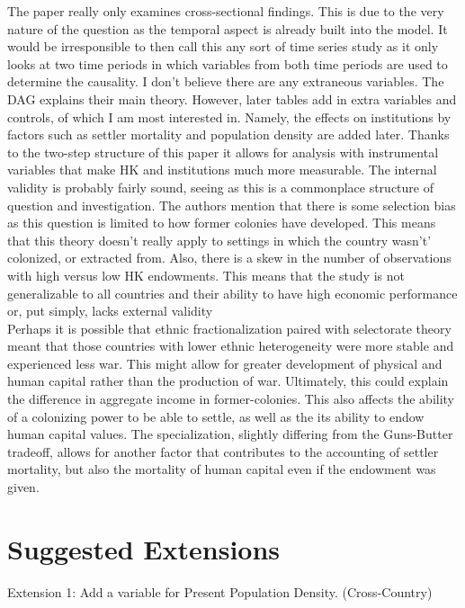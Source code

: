 \documentclass[12pt]{article}
\begin{document}
{The paper really only examines cross-sectional findings. This is due to the very nature of the question as the temporal aspect is already built into the model. It would be irresponsible to then call this any sort of time series study as it only looks at two time periods in which variables from both time periods are used to determine the causality. 
I don’t believe there are any extraneous variables. The DAG explains their main theory. However, later tables add in extra variables and controls, of which I am most interested in. Namely, the effects on institutions by factors such as settler mortality and population density are added later. Thanks to the two-step structure of this paper it allows for analysis with instrumental variables that make HK and institutions much more measurable.
The internal validity is probably fairly sound, seeing as this is a commonplace structure of question and investigation.
The authors mention that there is some selection bias as this question is limited to how former colonies have developed. This means that this theory doesn’t really apply to settings in which the country wasn’t’ colonized, or extracted from. Also, there is a skew in the number of observations with high versus low HK endowments. This means that the study is not generalizable to all countries and their ability to have high economic performance or, put simply, lacks external validity
 \\


Perhaps it is possible that ethnic fractionalization paired with selectorate theory meant that those countries with lower ethnic heterogeneity were more stable and experienced less war. This might allow for greater development of physical and human capital rather than the production of war. Ultimately, this could explain the difference in aggregate income in former-colonies. This also affects the ability of a colonizing power to be able to settle, as well as the its ability to endow human capital values. The specialization, slightly differing from the Guns-Butter tradeoff, allows for another factor that contributes to the accounting of settler mortality, but also the mortality of human capital even if the endowment was given.\\


\section{Suggested Extensions}

Extension 1: Add a variable for Present Population Density. (Cross-Country)

}
\end{document}
